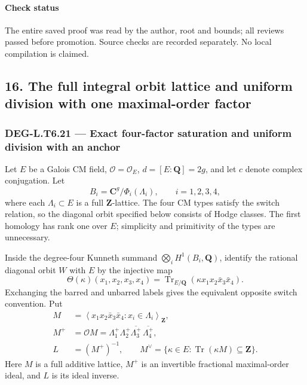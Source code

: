 \paragraph{Check status}\label{check-status-1}

The entire saved proof was read by the author, root and bounds; all reviews passed before promotion. Source checks are recorded separately. No local compilation is claimed.

\subsection{16. The full integral orbit lattice and uniform division with one maximal-order factor}\label{the-full-integral-orbit-lattice-and-uniform-division-with-one-maximal-order-factor}

\subsubsection{DEG-L.T6.21 --- Exact four-factor saturation and uniform division with an anchor}\label{DEG-L.T6.21}

Let \(E\) be a Galois CM field, \(\mathcal O=\mathcal O_E\), \(d=[E:\mathbf Q]=2g\), and let \(c\) denote complex conjugation. Let \[
 B_i=\mathbf C^g/\Phi_i(\Lambda_i),\qquad i=1,2,3,4,
\] where each \(\Lambda_i\subset E\) is a full \(\mathbf Z\)-lattice. The four CM types satisfy the switch relation, so the diagonal orbit specified below consists of Hodge classes. The first homology has rank one over \(E\); simplicity and primitivity of the types are unnecessary.

Inside the degree-four Kunneth summand \(\bigotimes_i H^1(B_i,\mathbf Q)\), identify the rational diagonal orbit \(W\) with \(E\) by the injective map \[
 \Theta(\kappa)(x_1,x_2,x_3,x_4)
   =\operatorname{Tr}_{E/\mathbf Q}
       (\kappa x_1x_2\bar x_3\bar x_4).
 \tag{T21.1}
\] Exchanging the barred and unbarred labels gives the equivalent opposite switch convention. Put \[
 \begin{aligned}
 M&=\left\langle x_1x_2\bar x_3\bar x_4:
                         x_i\in\Lambda_i\right\rangle_{\mathbf Z},\\
 M^+&=\mathcal O M
   =\Lambda_1^+\Lambda_2^+\overline{\Lambda_3^+}\,
                                  \overline{\Lambda_4^+},\\
 L&=(M^+)^{-1},\qquad
 M^\vee=\{\kappa\in E:\operatorname{Tr}(\kappa M)\subseteq\mathbf Z\}.
 \end{aligned}
 \tag{T21.2}
\] Here \(M\) is a full additive lattice, \(M^+\) is an invertible fractional maximal-order ideal, and \(L\) is its ideal inverse.

